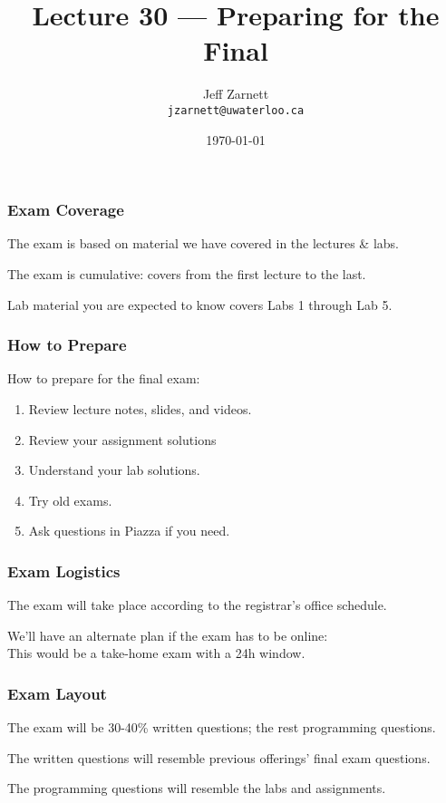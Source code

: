 

\title{Lecture 30 --- Preparing for the Final }

\author{Jeff Zarnett \\ \small \texttt{jzarnett@uwaterloo.ca}}
\date{\today}




\begin{frame}
  \titlepage

\end{frame}

\begin{frame}
\frametitle{Exam Coverage}

The exam is based on material we have covered in the lectures \& labs.

The exam is cumulative: covers from the first lecture to the last.

Lab material you are expected to know covers Labs 1 through Lab 5.

\end{frame}

\begin{frame}
\frametitle{How to Prepare}

How to prepare for the final exam:

\begin{enumerate}
	\item Review lecture notes, slides, and videos.
	\item Review your assignment solutions
	\item Understand your lab solutions.
	\item Try old exams.
	\item Ask questions in Piazza if you need.
\end{enumerate}

\end{frame}


\begin{frame}
\frametitle{Exam Logistics}

The exam will take place according to the registrar's office schedule.

We'll have an alternate plan if the exam has to be online:\\
\quad This would be a take-home exam with a 24h window.

\end{frame}


\begin{frame}
\frametitle{Exam Layout}

The exam will be 30-40\% written questions; the rest programming questions.

The written questions will resemble previous offerings' final exam questions.

The programming questions will resemble the labs and assignments.

\end{frame}


